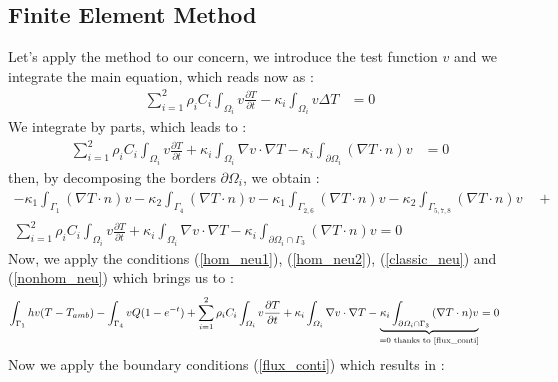 \subsection{Finite Element Method}
Let's apply the method to our concern, we introduce the test function $v$ and we integrate the main equation, which reads now as :
\begin{equation}
   \begin{split}
      \displaystyle{\sum_{i=1}^{2} \rho_i C_i \int_{\varOmega_i} v\frac{ \partial T}{\partial t} - \kappa_i \int_{\varOmega_i} v\Delta T }  & = 0  
  \end{split}
\end{equation}
We integrate by parts, which leads to :
\begin{equation}
   \begin{split}
      \displaystyle{\sum_{i=1}^{2} \rho_i C_i \int_{\varOmega_i} v\frac{ \partial T}{\partial t} +  \kappa_i \int_{\varOmega_i} {\nabla v \cdot \nabla T} - \kappa_i \int_{\partial \varOmega_i} {(\nabla T \cdot n) v} }  & = 0
  \end{split}
\end{equation}
then, by decomposing the borders $\partial\varOmega_i$, we obtain :
\begin{multline}
 \displaystyle{- \kappa_1 \int_{\Gamma_1}{(\nabla T \cdot n) v} - \kappa_2 \int_{\Gamma_4} {(\nabla T \cdot n) v} - \kappa_1 \int_{\Gamma_{2,6}}{(\nabla T \cdot n) v}  - \kappa_2 \int_{\Gamma_{5,7,8}}{(\nabla T \cdot n) v} } \quad + \\ \displaystyle{ \sum_{i=1}^{2}  \rho_i C_i \int_{\varOmega_i} v\frac{ \partial T}{\partial t} + \kappa_i \int_{\varOmega_i} {\nabla v \cdot \nabla T} - \kappa_i \int_{\partial\varOmega_i \cap \Gamma_3}{(\nabla T \cdot n) v}  } =   0 
\end{multline}
Now, we apply the conditions (\ref{hom_neu1}), (\ref{hom_neu2}), (\ref{classic_neu}) and (\ref{nonhom_neu}) which brings us to :
\begin{equation}
   \begin{split}
 \displaystyle{ \int_{\Gamma_1}{hv(T-T_{amb})} - \int_{\Gamma_4} {vQ(1-e^{-t})} + \sum_{i=1}^{2}  \rho_i C_i \int_{\varOmega_i} v\frac{ \partial T}{\partial t} + \kappa_i \int_{\varOmega_i} {\nabla v \cdot \nabla T}  - \underbrace{\kappa_i \int_{\partial\varOmega_i \cap \Gamma_3}{(\nabla T \cdot n) v}}_{\text{=0 thanks to \ref{flux_conti}}}  } & =   0 
  \end{split}
\end{equation}
Now we apply the boundary conditions (\ref{flux_conti}) which results in :
